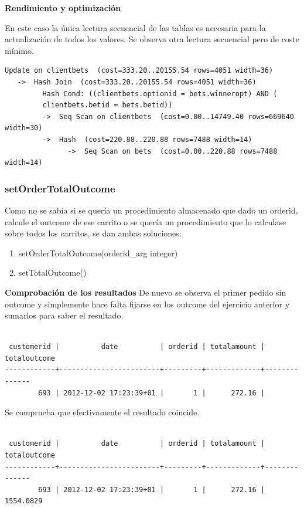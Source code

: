 \documentclass{article}
\begin{document}
$$\;$$

\textbf{Rendimiento y optimización}

En este caso la única lectura secuencial de las tablas es necesaria para la actualización de todos los valores. Se observa otra lectura secuencial pero de coste mínimo.

\begin{lstlisting}[style=sql]
 Update on clientbets  (cost=333.20..20155.54 rows=4051 width=36)
   ->  Hash Join  (cost=333.20..20155.54 rows=4051 width=36)
         Hash Cond: ((clientbets.optionid = bets.winneropt) AND (
         clientbets.betid = bets.betid))
         ->  Seq Scan on clientbets  (cost=0.00..14749.40 rows=669640 width=30)
         ->  Hash  (cost=220.88..220.88 rows=7488 width=14)
               ->  Seq Scan on bets  (cost=0.00..220.88 rows=7488 width=14)
\end{lstlisting}

\subsubsection{setOrderTotalOutcome}
Como no se sabía si se quería un procedimiento almacenado que dado un orderid, calcule el outcome de ese carrito o se quería un procedimiento que lo calculase sobre todos los carritos, se dan ambas soluciones:
\begin{enumerate}
\item setOrderTotalOutcome(orderid\_arg integer)
\item setTotalOutcome()
\end{enumerate}
\textbf{Comprobación de los resultados}
De nuevo se observa el primer pedido sin outcome y simplemente hace falta fijarse en los outcome del ejercicio anterior y sumarlos para saber el resultado.
\begin{lstlisting}[style=sql]

 customerid |          date          | orderid | totalamount | totaloutcome
------------+------------------------+---------+-------------+--------------
        693 | 2012-12-02 17:23:39+01 |       1 |      272.16 |
\end{lstlisting}
Se comprueba que efectivamente el resultado coincide.
\begin{lstlisting}[style=sql]

 customerid |          date          | orderid | totalamount | totaloutcome
------------+------------------------+---------+-------------+--------------
        693 | 2012-12-02 17:23:39+01 |       1 |      272.16 |    1554.0829
\end{lstlisting}
\end{document}

